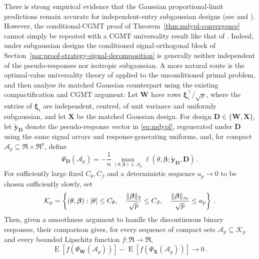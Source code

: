 \documentclass{article}
\makeatletter
\DeclareMathOperator{\expect}{E}
\theoremstyle{definition}
\newcommand{\vnorm}[1]{%
	\ensuremath{%
		\if@display
		\left\| #1 \right\|
		\else
		\| #1 \|
		\fi
	}%
}
\newcommand{\abs}[1]{%
	\ensuremath{%
		\if@display
		\left| #1 \right|
		\else
		\lvert #1 \rvert
		\fi
	}%
}
\newcommand*{\bb}{\boldsymbol}
\def\bW {\bb{W}}
\def\bX{\bb{X}}
\def\bYtil{\widetilde{\bb{y}}}
\def\bbeta{\bb{\beta}}
\def\bxi{\bb{\xi}}
\makeatother
\begin{document}
\begin{bibunit}
There is strong empirical evidence that the Gaussian proportional-limit
predictions remain accurate for independent-entry subgaussian designs (see
\citealt[Section~6]{zhao+etal:2022} and
\citealt[Sections~8 and~S2.5]{sterzinger+kosmidis:2026}). However, the
conditional-CGMT proof of Theorem~\ref{thm:mdypl-convergence} cannot simply
be repeated with a CGMT universality result like that of \citet{han+shen:2023}.
Indeed, under subgaussian designs the conditioned signal-orthogonal block of Section~\ref{par:proof-strategy-signal-decomposition} 
is generally neither independent of the pseudo-responses nor isotropic subgaussian.
A more natural route is the
optimal-value universality theory of \citet{montanari+saeed:2022} applied to the
unconditioned primal problem, and then analyse its matched Gaussian
counterpart using the existing compactification and CGMT argument:
Let $\bW$ have rows $\bxi_i^\top/\sqrt p$, where the entries of $\bxi_i$
are independent, centred, of unit variance and uniformly subgaussian, and
let $\bX$ be the matched Gaussian design. For design
$\bb D\in\{\bW,\bX\}$, let $\bYtil_{\bb D}$ denote the pseudo-response
vector in \eqref{eq:mdypl}, regenerated under $\bb D$ using the same signal
arrays and response-generating uniforms, and, for compact
$\mathcal A_p\subseteq\Re\times\Re^p$, define
\begin{equation}
\label{eq:subgaussian-restricted-value}
    \Psi_{\bb D}(\mathcal A_p)
    =
    -\frac1n
    \max_{(\theta,\bbeta)\in\mathcal A_p}
    \ell(\theta,\bbeta;\bYtil_{\bb D},\bb D)\,.
\end{equation}
For sufficiently large fixed $C_\theta,C_\beta$ and a deterministic
sequence $a_p\to0$ to be chosen sufficiently slowly, set
\begin{equation}
\label{eq:subgaussian-containment-set}
    \mathcal K_p
    =
    \left\{
        (\theta,\bbeta):
        \abs{\theta}\leq C_\theta,\quad
        \frac{\vnorm{\bbeta}_2}{\sqrt p}\leq C_\beta,\quad
        \frac{\vnorm{\bbeta}_\infty}{\sqrt p}\leq a_p
    \right\} \,. 
\end{equation}
Then, given a smoothness argument to handle the discontinuous binary responses, their comparison 
gives, for every sequence of compact sets
$\mathcal A_p\subseteq\mathcal K_p$ and every bounded Lipschitz function
$f:\Re\to\Re$,
\begin{equation}
\label{eq:subgaussian-value-universality}
    \expect [f(\Psi_{\bW}(\mathcal A_p))]
    -
    \expect [f(\Psi_{\bX}(\mathcal A_p))]
    \longrightarrow0\,.
\end{equation}

\end{bibunit}
\end{document}
